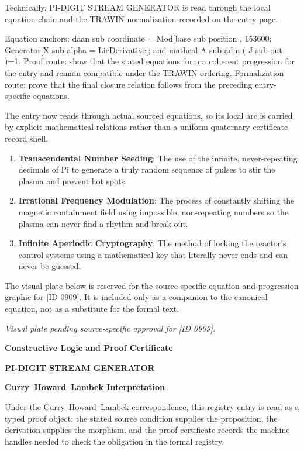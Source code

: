 Technically, PI-DIGIT STREAM GENERATOR is read through the local equation chain and the TRAWIN normalization recorded on the entry page.

Equation anchors: daan sub coordinate = Mod[base sub position , 153600; Generator[X sub alpha = LieDerivative[; and mathcal A sub adm ( J sub out )=1. Proof route: show that the stated equations form a coherent progression for the entry and remain compatible under the TRAWIN ordering. Formalization route: prove that the final closure relation follows from the preceding entry-specific equations.

The entry now reads through actual sourced equations, so its local arc is carried by explicit mathematical relations rather than a uniform quaternary certificate record shell.
\endgroup

\begin{enumerate}[leftmargin=1.6em,itemsep=6pt,topsep=4pt]
\item \textbf{Transcendental Number Seeding}: The use of the infinite, never-repeating decimals of Pi to generate a truly random sequence of pulses to stir the plasma and prevent hot spots.
\item \textbf{Irrational Frequency Modulation}: The process of constantly shifting the magnetic containment field using impossible, non-repeating numbers so the plasma can never find a rhythm and break out.
\item \textbf{Infinite Aperiodic Cryptography}: The method of locking the reactor's control systems using a mathematical key that literally never ends and can never be guessed.
\end{enumerate}

\begingroup\footnotesize\sloppy
The visual plate below is reserved for the source-specific equation and progression graphic for [ID 0909]. It is included only as a companion to the canonical equation, not as a substitute for the formal text.
\par\endgroup
\begingroup\footnotesize\itshape
Visual plate pending source-specific approval for [ID 0909].
\par\endgroup

\clearpage
\begingroup\tzpsupportsetup
\noindent\textbf{\fontsize{10.8pt}{12.8pt}\selectfont [ID 0909] Constructive Logic and Proof Certificate}\par
\noindent\textbf{\fontsize{10pt}{12pt}\selectfont PI-DIGIT STREAM GENERATOR}\par
\vspace{0.45em}
\begingroup
\footnotesize
\setlength{\parskip}{0.22em}
\setlength{\parindent}{0pt}
\noindent\textbf{Curry--Howard--Lambek Interpretation}\par
Under the Curry--Howard--Lambek correspondence, this registry entry is read as a typed proof
object: the stated source condition supplies the proposition, the derivation supplies the
morphism, and the proof certificate records the machine handles needed to check the obligation
in the formal registry.

